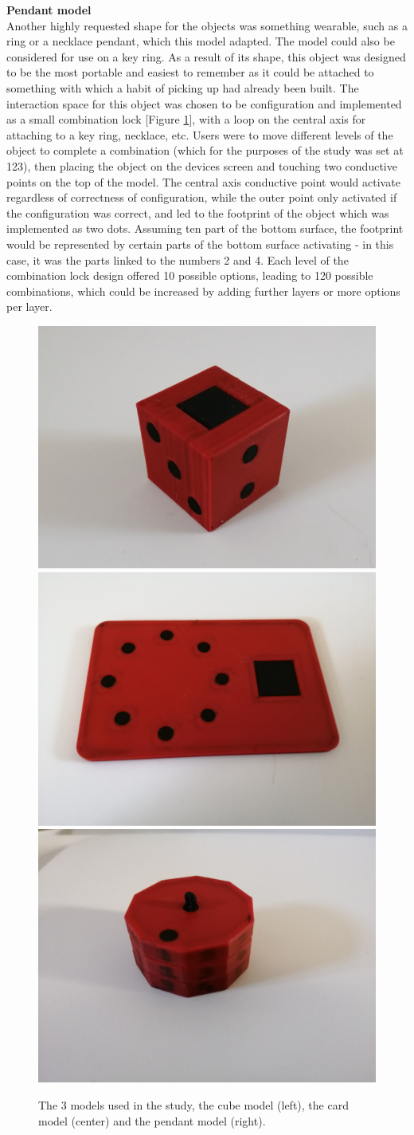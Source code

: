 \documentclass{l4proj}
\begin{document}
\textbf{Pendant model}\\
Another highly requested shape for the objects was something wearable, such as a ring or a necklace pendant, which this model adapted. The model could also be considered for use on a key ring. As a result of its shape, this object was designed to be the most portable and easiest to remember as it could be attached to something with which a habit of picking up had already been built. The interaction space for this object was chosen to be configuration and implemented as a small combination lock [Figure \ref{fig:models}], with a loop on the central axis for attaching to a key ring, necklace, etc. Users were to move different levels of the object to complete a combination (which for the purposes of the study was set at 123), then placing the object on the devices screen and touching two conductive points on the top of the model. The central axis conductive point would activate regardless of correctness of configuration, while the outer point only activated if the configuration was correct, and led to the footprint of the object which was implemented as two dots. Assuming ten part of the bottom surface, the footprint would be represented by certain parts of the bottom surface activating - in this case, it was the parts linked to the numbers 2 and 4. Each level of the combination lock design offered 10 possible options, leading to 120 possible combinations, which could be increased by adding further layers or more options per layer.

\begin{figure}
    \includegraphics[width=.33\linewidth]{images/die_pic_general.jpg}
    \includegraphics[width=.33\linewidth]{images/ccard_pic_general.jpg}
    \includegraphics[width=.33\linewidth]{images/pendant_pic_1.jpg}
    \caption{The 3 models used in the study, the cube model (left), the card model (center) and the pendant model (right).}
    \label{fig:models}
\end{figure}
\end{document}
